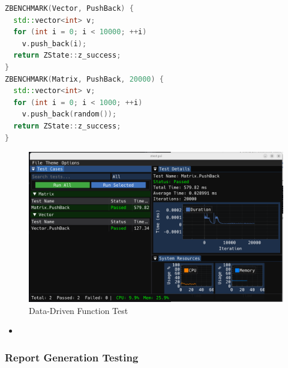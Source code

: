 \documentclass{article}
\begin{document}
\begin{framed}

    \begin{lstlisting}[language=C++]
ZBENCHMARK(Vector, PushBack) {
  std::vector<int> v;
  for (int i = 0; i < 10000; ++i)
    v.push_back(i);
  return ZState::z_success;
}
ZBENCHMARK(Matrix, PushBack, 20000) {
  std::vector<int> v;
  for (int i = 0; i < 1000; ++i)
    v.push_back(random());
  return ZState::z_success;
}\end{lstlisting}
\end{framed}
\begin{figure}[H]
    \centering
    \includegraphics[width=\textwidth]{img/ben.png}
    \caption{Data-Driven Function Test}
    \label{fig: Data-Driven Function Test}
\end{figure}

\begin{itemize}
    \item
\end{itemize}
\subsubsection{Report Generation Testing}
\end{document}
